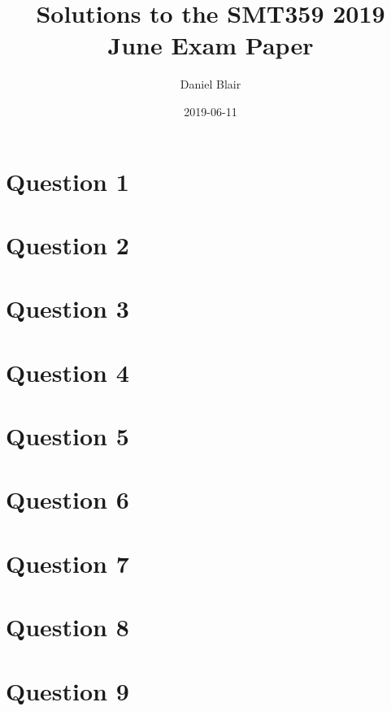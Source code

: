 \documentclass{article}
\title{Solutions to the SMT359 2019 June Exam Paper}
\author{Daniel Blair}
\date{2019-06-11}
\begin{document}
\begin{titlingpage}
    \maketitle
\end{titlingpage}

\fancyhf{}


\section{Question 1}


\section{Question 2}


\section{Question 3}


\section{Question 4}


\section{Question 5}


\section{Question 6}


\section{Question 7}


\section{Question 8}


\section{Question 9}

\end{document}
